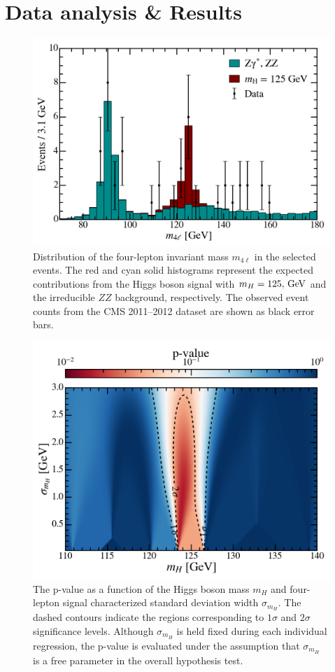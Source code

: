 \documentclass[aps,twocolumn,secnumarabic,balancelastpage,amsmath,amssymb,nofootinbib,floatfix]{revtex4-1}
\newcommand{\GeV}{\,{\rm GeV}}
\begin{document}
\section{Data analysis \& Results}
\label{sec:result}

\begin{figure}
    \centering
    \includegraphics[width=0.49 \textwidth]{Figures/event_histogram.png}
    \caption{Distribution of the four-lepton invariant mass $m_{4\ell}$ in the selected events. The red and cyan solid histograms represent the expected contributions from the Higgs boson signal with $m_H = 125,\GeV$ and the irreducible $ZZ$ background, respectively. The observed event counts from the CMS 2011–2012 dataset are shown as black error bars.}
    \label{fig:event_histogram}
\end{figure}

\begin{figure}
    \centering
    \includegraphics[width=0.49 \textwidth]{Figures/p-value.png}
    \caption{The p-value as a function of the Higgs boson mass $m_H$ and four-lepton signal characterized standard deviation width $\sigma_{m_H}$. The dashed contours indicate the regions corresponding to $1\sigma$ and $2\sigma$ significance levels. Although $\sigma_{m_H}$ is held fixed during each individual regression, the p-value is evaluated under the assumption that $\sigma_{m_H}$ is a free parameter in the overall hypothesis test.}
    \label{fig:p-value}
\end{figure}
\end{document}
